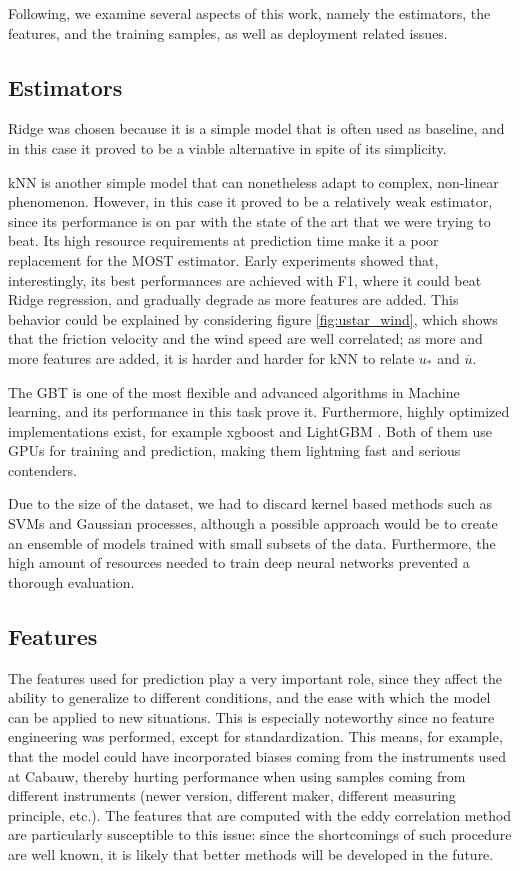 \documentclass[a4paper,11pt]{kth-mag}
\begin{document}
Following, we examine several aspects of this work, namely the estimators, the features, and the training samples, as well as deployment related issues.

\subsection{Estimators}
Ridge was chosen because it is a simple model that is often used as baseline, and in this case it proved to be a viable alternative in spite of its simplicity.

kNN is another simple model that can nonetheless adapt to complex, non-linear phenomenon. However, in this case it proved to be a relatively weak estimator, since its performance is on par with the state of the art that we were trying to beat. Its high resource requirements at prediction time make it a poor replacement for the MOST estimator. Early experiments showed that, interestingly, its best performances are achieved with F1, where it could beat Ridge regression, and gradually degrade as more features are added. This behavior could be explained by considering figure \ref{fig:ustar_wind}, which shows that the friction velocity and the wind speed are well correlated; as more and more features are added, it is harder and harder for kNN to relate $u_*$ and $\overline{u}$.

The GBT is one of the most flexible and advanced algorithms in Machine learning, and its performance in this task prove it. Furthermore, highly optimized implementations exist, for example xgboost \citep{xgboost} and LightGBM \citep{lightgbm}. Both of them use GPUs for training and prediction, making them lightning fast and serious contenders.

Due to the size of the dataset, we had to discard kernel based methods such as SVMs and Gaussian processes, although a possible approach would be to create an ensemble of models trained with small subsets of the data. Furthermore, the high amount of resources needed to train deep neural networks prevented a thorough evaluation.

\subsection{Features}
The features used for prediction play a very important role, since they affect the ability to generalize to different conditions, and the ease with which the model can be applied to new situations. This is especially noteworthy since no feature engineering was performed, except for standardization. This means, for example, that the model could have incorporated biases coming from the instruments used at Cabauw, thereby hurting performance when using samples coming from different instruments (newer version, different maker, different measuring principle, etc.). The features that are computed with the eddy correlation method are particularly susceptible to this issue: since the shortcomings of such procedure are well known, it is likely that better methods will be developed in the future.
\end{document}
